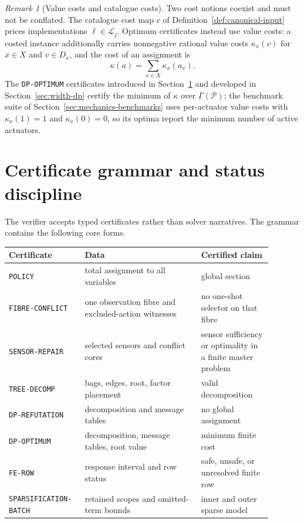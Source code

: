 \documentclass[11pt]{article}
\theoremstyle{plain}
\theoremstyle{definition}
\theoremstyle{remark}
\newtheorem{remark}[theorem]{Remark}
\begin{document}
\begin{remark}[Value costs and catalogue costs]
\label{rem:costs}
Two cost notions coexist and must not be conflated.  The catalogue cost map
\(c\) of Definition~\ref{def:canonical-input} prices implementations
\(\ell\in\mathcal L_j\).  Optimum certificates instead use value costs: a
costed instance additionally carries nonnegative rational value costs
\(\kappa_x(v)\) for \(x\in X\) and \(v\in D_x\), and the cost of an
assignment is
\[
  \kappa(a)=\sum_{x\in X}\kappa_x(a_x).
\]
The \texttt{DP-OPTIMUM} certificates introduced in
Section~\ref{sec:certificates} and developed in Section~\ref{sec:width-dp}
certify the minimum of \(\kappa\) over \(\Gamma(\mathcal P)\); the benchmark suite of
Section~\ref{sec:mechanics-benchmarks} uses per-actuator value costs with
\(\kappa_x(1)=1\) and \(\kappa_x(0)=0\), so its optima report the minimum
number of active actuators.
\end{remark}

\section{Certificate grammar and status discipline}
\label{sec:certificates}

The verifier accepts typed certificates rather than solver narratives.  The
grammar contains the following core forms.

\begin{center}
\begin{tabular}{@{}p{0.23\linewidth}p{0.41\linewidth}p{0.25\linewidth}@{}}
\toprule
Certificate & Data & Certified claim\\
\midrule
\texttt{POLICY} & total assignment to all variables & global section\\
\texttt{FIBRE-CONFLICT} & one observation fibre and excluded-action witnesses & no one-shot selector on that fibre\\
\texttt{SENSOR-REPAIR} & selected sensors and conflict cores & sensor sufficiency or optimality in a finite master problem\\
\texttt{TREE-DECOMP} & bags, edges, root, factor placement & valid decomposition\\
\texttt{DP-REFUTATION} & decomposition and message tables & no global assignment\\
\texttt{DP-OPTIMUM} & decomposition, message tables, root value & minimum finite cost\\
\texttt{FE-ROW} & response interval and row status & safe, unsafe, or unresolved finite row\\
\texttt{SPARSIFICATION-\allowbreak BATCH} & retained scopes and omitted-term bounds & inner and outer sparse model\\
\bottomrule
\end{tabular}
\end{center}
\end{document}
